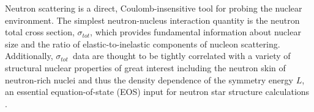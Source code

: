 \documentclass[twocolumn,secnumarabic,amssymb, nobibnotes, aps, prl,
superscriptaddress, nobalancelastpage, draft]{revtex4}
\newcommand{\tot}{\ensuremath{\sigma_{tot}}}
\begin{document}
\author{H. Y. Lee}
\author{M. Devlin}
\author{N. Fotiadis}
\author{S. Mosby}
\maketitle

Neutron scattering is a direct, Coulomb-insensitive tool for probing the nuclear
environment. The simplest neutron-nucleus interaction quantity is 
the neutron total cross section, \tot, which provides fundamental information about
nuclear size and the ratio of elastic-to-inelastic components of nucleon 
scattering. Additionally, \tot\ data are thought to be tightly correlated with
a variety of structural nuclear properties of great interest
including the neutron skin of neutron-rich nuclei
\cite{Mahzoon2017} and thus the density dependence of the symmetry energy $L$,
an essential equation-of-state (EOS) input for neutron star
structure calculations \cite{Fattoyev2012, Vinas2014, Brown2000}.
\end{document}

